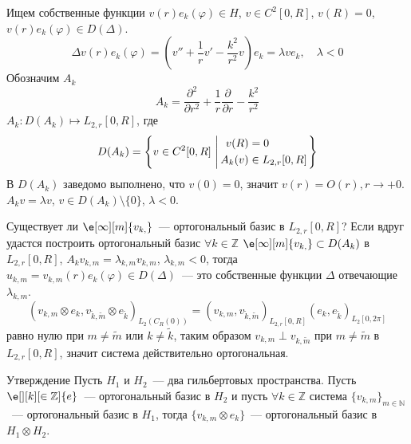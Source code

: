 \documentclass[14pt]{extarticle}
\newcommand{\tmp}[1][]{v_{k, #1}}
\begin{document}
Ищем собственные функции $v(r)e_k(\varphi) \in H$, $v \in C^2[0, R]$, $v(R) = 0$, 
$v(r)e_k(\varphi) \in D(\Delta)$.
$$
\Delta v(r)e_k(\varphi) = (v'' + \dfrac{1}{r} v' - \dfrac{k^2}{r^2}v)e_k = \lambda v e_k,\quad 
\lambda < 0
$$
Обозначим $A_k$
$$
A_k = \dfrac{\partial^2}{\partial r^2} + \dfrac{1}{r} \dfrac{\partial}{\partial r} - \dfrac{k^2}{r^2}
$$
$A_k : D(A_k) \mapsto L_{2, r}[0, R]$, где
$$
D(A_k) = \left\{v \in C^2[0, R] \left\arrowvert
\begin{aligned}
v(R) &= 0\\
A_k(v) &\in L_{2, r}[0, R]
\end{aligned}
\right.\right\}
$$
В $D(A_k)$ заведомо выполнено, что $v(0) = 0$, значит $v(r) = O(r), r \to +0$.
$A_k v = \lambda v$, $v \in D(A_k) \setminus \{0\}$, $\lambda < 0$.

Существует ли $\e[\infty][m]{\tmp{}}$~--- ортогональный базис в $L_{2, r}[0, R]$? 
Если вдруг удастся построить ортогональный базис $\forall k \in \mathbb Z$
$\e[\infty][m]{\tmp{}} \subset D(A_k)$ в $L_{2, r}[0, R]$, $A_k v_{k,m} = \lambda_{k, m}v_{k, m}$,
$\lambda_{k, m} < 0$, тогда $u_{k, m} = v_{k, m}(r) e_k(\varphi) \in D(\Delta)$~--- это 
собственные функции $\Delta$ отвечающие $\lambda_{k, m}$.
$$
(v_{k,m} \otimes e_k, v_{\tilde{k}, \tilde{m}} \otimes e_{\tilde{k}})_{L_2(C_R(0))} =
(v_{k, m}, v_{\tilde{k}, \tilde{m}})_{L_{2, r}[0, R]}(e_k, e_{\tilde{k}})_{L_2[0, 2\pi]}
$$
равно нулю при $m \ne \tilde{m}$ или $k \ne \tilde{k}$, таким образом $v_{k, m} \perp 
v_{k, \tilde{m}}$ при $m \ne \tilde{m}$ в $L_{2, r}[0, R]$, значит система действительно
ортогональная.
\begin{MathCl}{Утверждение}
    Пусть $H_1$ и $H_2$~--- два гильбертовых пространства.
    Пусть $\e[][k][\in \mathbb Z]{e}$~--- ортогональный базис в $H_2$ 
    и пусть $\forall k \in \mathbb Z$ система $\{v_{k, m}\}_{m \in \mathbb N}$~--- 
    ортогональный базис в $H_1$, тогда $\{v_{k, m} \otimes e_k\}$~--- ортогональный базис
    в $H_1 \otimes H_2$.
\end{MathCl}
\end{document}
